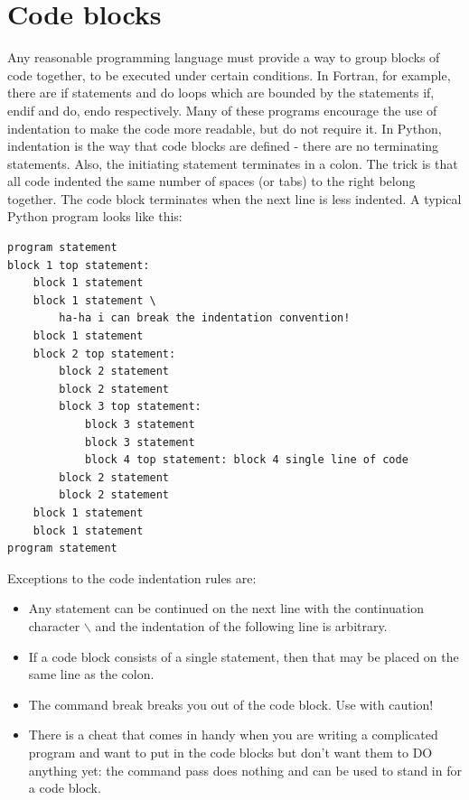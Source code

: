 \documentclass[11pt]{book}
\begin{document}
{{\section{Code blocks}
Any reasonable programming language must provide a way to group blocks of code together, to be executed under certain conditions.  In Fortran, for example, there are if statements and do loops which are bounded by the statements if, endif and do, endo respectively.  Many of these programs encourage the use of indentation to make the code more readable, but do not require it.  In Python, indentation is the way that code blocks are defined - there are no terminating statements. Also, the initiating statement terminates in a colon.  The trick is that all code indented the same number of spaces (or tabs) to the right belong together.  The code block terminates when the next line is less indented.     A typical Python program looks like this:

{ \color{blue}\begin {verbatim}
program statement
block 1 top statement:
    block 1 statement
    block 1 statement \
        ha-ha i can break the indentation convention!
    block 1 statement
    block 2 top statement:
        block 2 statement
        block 2 statement
        block 3 top statement:
            block 3 statement
            block 3 statement
            block 4 top statement: block 4 single line of code
        block 2 statement
        block 2 statement
    block 1 statement
    block 1 statement
program statement
\end{verbatim}}


\noindent Exceptions to the code indentation rules are:
\begin{itemize}
\item  Any statement can be continued on the next line with the continuation character $\backslash$ and the indentation of the following line is arbitrary.  \item If a code block consists of a single statement, then that may be placed on the same line as the colon.
\item The command {\color{blue}break} breaks you out of the code block. Use with caution!
\item There is a cheat that comes in handy when you are writing a complicated program and want to put in the code blocks but don't want them to DO anything yet:  the command  {\color{blue} pass} does nothing and can be used to stand in for a code block.
\end{itemize}

}}
\end{document}
